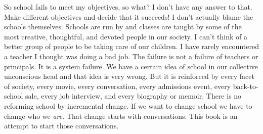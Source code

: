 \documentclass[11pt]{book}
\begin{document}
So school fails to meet my objectives, so what?  I don't have any
answer to that.  Make different objectives and decide that it
succeeds!  I don't actually blame the schools themselves.  Schools are
run by and classes are taught by some of the most creative,
thoughtful, and devoted people in our society.  I can't think of a
better group of people to be taking care of our children.  I have
rarely encountered a teacher I thought was doing a bad job.  The
failure is not a failure of teachers or principals.  It is a system
failure.  We have a certain idea of school in our collective
unconscious head and that idea is very wrong.  But it is reinforced by
every facet of society, every movie, every conversation, every
admissions event, every back-to-school sale, every job interview, and
every biography or memoir.  There is no reforming school by
incremental change.  If we want to change school we have to change who
we \emph{are}.  That change starts with conversations.  This book is
an attempt to start those conversations.


\end{document}
